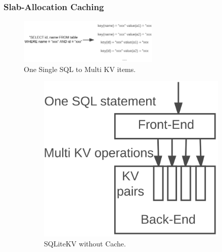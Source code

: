 	\subsubsection{Slab-Allocation Caching}
		\begin{figure}
		\centering
		\includegraphics[width=0.6\textwidth]{pic/Cache-eg.pdf}
		\caption{One Single SQL to Multi KV items.}
		\label{fig:CacheEG}
	\end{figure}
		\begin{figure}[h]
			\centering
			\begin{subfigure}[b]{0.35\textwidth}
				\includegraphics[width=\textwidth]{pic/KVCache.pdf}
				\caption{SQLiteKV without Cache.}
				\label{fig:KVCache}
			\end{subfigure}
		\begin{subfigure}[b]{0.35\textwidth}

\end{subfigure}
\end{figure}
